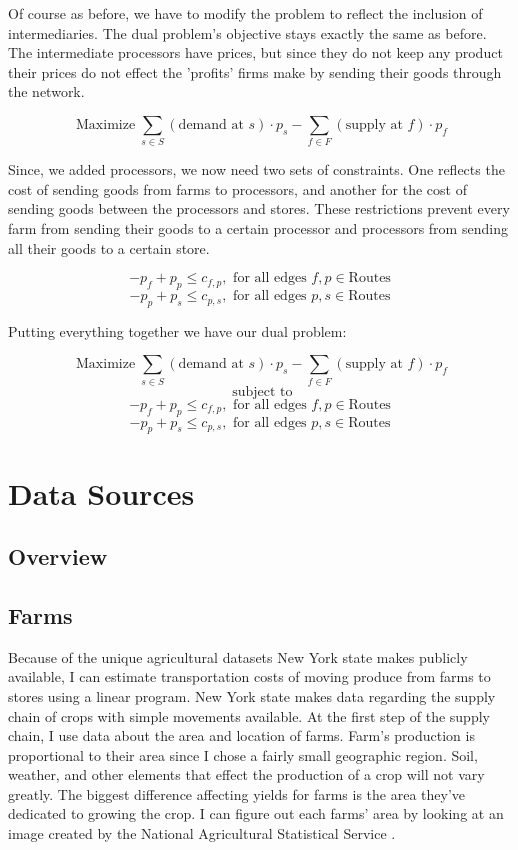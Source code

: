 \documentclass{report}
\begin{document}
Of course as before, we have to modify the problem to reflect the inclusion of intermediaries. The dual problem's objective stays exactly the same as before. The intermediate processors have prices, but since they do not keep any product their prices do not effect the 'profits' firms make by sending their goods through the network.

$$\operatorname{Maximize} \sum_{s \in S}  (\text{demand at } s) \cdot p_{s} -   \sum_{f \in F}  (\text{supply at } f) \cdot p_{f} $$

Since, we added processors, we now need two sets of constraints. One reflects the cost of sending goods from farms to processors, and another for the cost of sending goods between the processors and stores. These restrictions  prevent every farm from sending their goods to a certain processor and processors from sending all their goods to a certain store.

$$ -p_f + p_p \leq c_{f,p}, \text{ for all edges }  f,p\in \textrm{Routes}$$
$$ -p_p + p_s \leq c_{p,s}, \text{ for all edges }  p,s\in \textrm{Routes}$$

Putting everything together we have our dual problem:

$$\operatorname{Maximize} \sum_{s \in S}  (\text{demand at } s) \cdot p_{s} -   \sum_{f \in F}  (\text{supply at } f) \cdot p_{f} $$
$$ \text{ subject to}$$
$$ -p_f + p_p \leq c_{f,p}, \text{ for all edges } f,p\in \textrm{Routes}$$
$$ -p_p + p_s \leq c_{p,s}, \text{ for all edges } p,s\in \textrm{Routes}$$


\chapter{Data Sources}

\section{Overview}

\section{Farms}

Because of the unique agricultural datasets New York state makes publicly available, I can estimate transportation costs of moving produce from farms to stores using a linear program. New York state makes data regarding the supply chain of crops with simple movements available. At the first step of the supply chain, I use data about the area and location of farms. Farm's production is proportional to their area since I chose a fairly small geographic region. Soil, weather, and other elements that effect the production of a crop will not vary greatly. The biggest difference affecting yields for farms is the area they've dedicated to growing the crop. I can figure out each farms' area by looking at an image created by the National Agricultural Statistical Service \cite{nass}.
\end{document}
